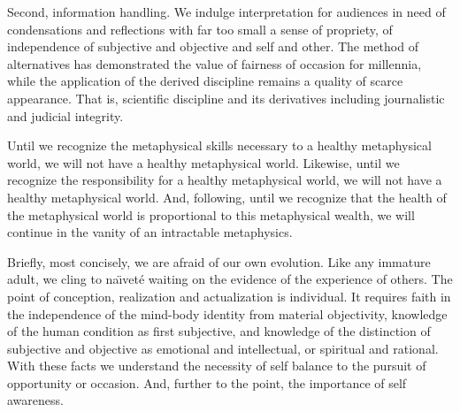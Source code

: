 Second, information handling.  We indulge interpretation for audiences
in need of condensations and reflections with far too small a sense of
propriety, of independence of subjective and objective and self and
other.  The method of alternatives has demonstrated the value of
fairness of occasion for millennia, while the application of the
derived discipline remains a quality of scarce appearance.  That is,
scientific discipline and its derivatives including journalistic and
judicial integrity.

Until we recognize the metaphysical skills necessary to a healthy
metaphysical world, we will not have a healthy metaphysical world.
Likewise, until we recognize the responsibility for a healthy
metaphysical world, we will not have a healthy metaphysical world.
And, following, until we recognize that the health of the metaphysical
world is proportional to this metaphysical \break wealth, we will
continue in the vanity of an intractable metaphysics.

Briefly, most concisely, we are afraid of our own evolution.  Like any
immature adult, we cling to na\"{\i}vet\'{e} waiting on the evidence
of the experience of others.  The point of conception, realization and
actualization is individual.  It requires faith in the independence of
the mind-body identity from material objectivity, knowledge of the
human condition as first subjective, and knowledge of the distinction
of subjective and objective as emotional and intellectual, or
spiritual and rational.  With these facts we understand the necessity
of self balance to the pursuit of opportunity or occasion.  And,
further to the point, the importance of self awareness.

\vfill
\bye
